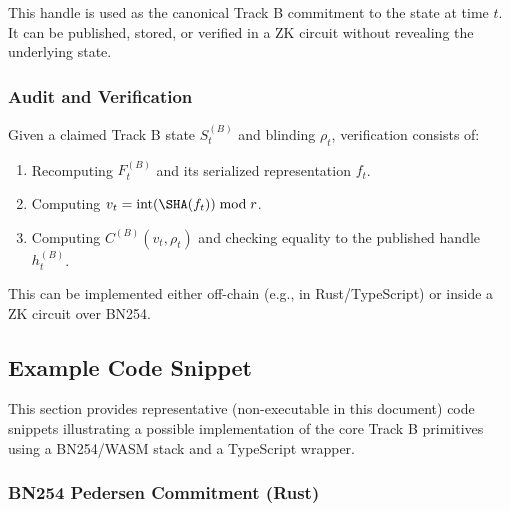 \documentclass[11pt]{article}
\begin{document}
This handle is used as the canonical Track B commitment to the state at time \(t\).
It can be published, stored, or verified in a ZK circuit without revealing the underlying state.

\subsubsection{Audit and Verification}

Given a claimed Track B state \(S_t^{(B)}\) and blinding \(\rho_t\), verification consists of:
\begin{enumerate}[leftmargin=1.5em]
  \item Recomputing \(F_t^{(B)}\) and its serialized representation \(f_t\).
  \item Computing \(v_t = \mathrm{int}(\SHA(f_t)) \bmod r\).
  \item Computing \(C^{(B)}(v_t,\rho_t)\) and checking equality to the published handle \(h_t^{(B)}\).
\end{enumerate}

This can be implemented either off-chain (e.g., in Rust/TypeScript) or inside a ZK circuit over BN254.

\subsection{Example Code Snippet}

This section provides representative (non-executable in this document) code snippets illustrating a possible implementation of the core Track B primitives using a BN254/WASM stack and a TypeScript wrapper.

\subsubsection{BN254 Pedersen Commitment (Rust)}
\end{document}
